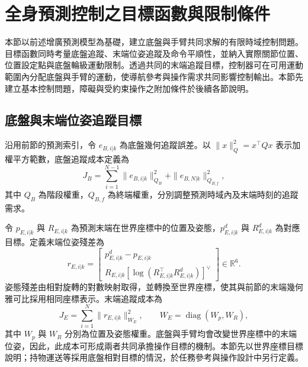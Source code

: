 
\section{全身預測控制之目標函數與限制條件}
\label{sec:wholebody_objective_constraints}

本節以前述增廣預測模型為基礎，建立底盤與手臂共同求解的有限時域控制問題。目標函數同時考量底盤追蹤、末端位姿追蹤及命令平順性，並納入實際關節位置、位置設定點與底盤輪級運動限制。透過共同的末端追蹤目標，控制器可在可用運動範圍內分配底盤與手臂的運動，使導航參考與操作需求共同影響控制輸出。本節先建立基本控制問題，障礙與受約束操作之附加條件於後續各節說明。

\subsection{底盤與末端位姿追蹤目標}
\label{subsec:wholebody_tracking_objective}

沿用前節的預測索引，令 $e_{B,i|k}$ 為底盤幾何追蹤誤差。以 $\|x\|_Q^2=x^{\top}Qx$ 表示加權平方範數，底盤追蹤成本定義為
\begin{equation}
    J_B=
    \sum_{i=1}^{N-1}\|e_{B,i|k}\|_{Q_B}^{2}
    +\|e_{B,N|k}\|_{Q_{B,f}}^{2},
    \label{eq:ch3_base_tracking_cost}
\end{equation}
其中 $Q_B$ 為階段權重，$Q_{B,f}$ 為終端權重，分別調整預測時域內及末端時刻的追蹤需求。

令 $p_{E,i|k}$ 與 $R_{E,i|k}$ 為預測末端在世界座標中的位置及姿態，$p_{E,i|k}^{d}$ 與 $R_{E,i|k}^{d}$ 為對應目標。定義末端位姿殘差為
\begin{equation}
    r_{E,i|k}=
    \begin{bmatrix}
        p_{E,i|k}^{d}-p_{E,i|k} \\
        R_{E,i|k}
        \left[\log\!\left(R_{E,i|k}^{\top}R_{E,i|k}^{d}\right)\right]^{\vee}
    \end{bmatrix}
    \in\mathbb{R}^{6}.
    \label{eq:ch3_tcp_pose_residual}
\end{equation}
姿態殘差由相對旋轉的對數映射取得，並轉換至世界座標，使其與前節的末端幾何雅可比採用相同座標表示。末端追蹤成本為
\begin{equation}
    J_E=\sum_{i=1}^{N}\|r_{E,i|k}\|_{W_E}^{2},
    \qquad
    W_E=\operatorname{diag}(W_p,W_R),
    \label{eq:ch3_tcp_tracking_cost}
\end{equation}
其中 $W_p$ 與 $W_R$ 分別為位置及姿態權重。底盤與手臂均會改變世界座標中的末端位姿，因此，此成本可形成兩者共同承擔操作目標的機制。本節先以世界座標目標說明；持物運送等採用底盤相對目標的情況，於任務參考與操作設計中另行定義。

